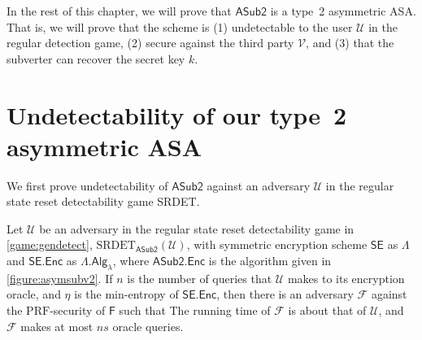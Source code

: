 In the rest of this chapter, we will prove that $\mathsf{ASub2}$ is a type~2 asymmetric ASA. That is, we will prove that the scheme is (1) undetectable to the user $\mathcal{U}$ in the regular detection game, (2) secure against the third party $\mathcal{V}$, and (3) that the subverter can recover the secret key $k$.

\section{Undetectability of our type~2 asymmetric ASA}
We first prove undetectability of $\mathsf{ASub2}$ against an adversary $\mathcal{U}$ in the regular state reset detectability game SRDET.

\begin{theorem} \label{theorem:detect2}
Let $\mathcal{U}$ be an adversary in the regular state reset detectability game in \autoref{game:gendetect}, $\mathrm{SRDET}_\mathsf{ASub2}(\mathcal{U})$, with symmetric encryption scheme $\mathsf{SE}$ as $\mathsf{\Lambda}$ and $\mathsf{SE.Enc}$ as $\mathsf{\Lambda.Alg}_\lambda$, where $\mathsf{ASub2.Enc}$ is the algorithm given in \autoref{figure:asymsubv2}. If $n$ is the number of queries that $\mathcal{U}$ makes to its encryption oracle, and $\eta$ is the min-entropy of $\mathsf{SE.Enc}$, then there is an adversary $\mathcal{F}$ against the $\mathrm{PRF}$-security of $\mathsf{F}$ such that
The running time of $\mathcal{F}$ is about that of $\mathcal{U}$, and $\mathcal{F}$ makes at most $ns$ oracle queries.
\end{theorem}
